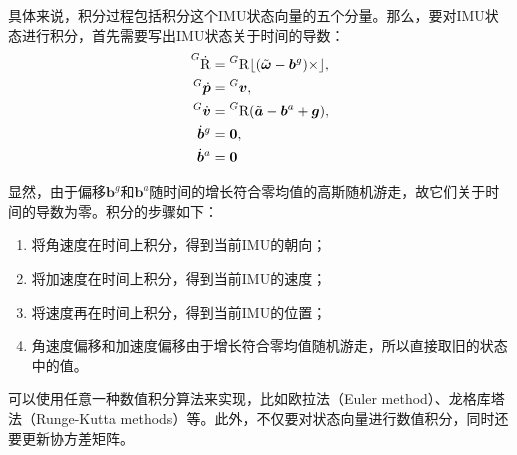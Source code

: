 具体来说，积分过程包括积分这个IMU状态向量的五个分量。那么，要对IMU状态进行积分，首先需要写出IMU状态关于时间的导数：
\begin{equation}
\begin{aligned}
    \prescript{G}{}{\dot{\mathrm R}}
        &= \prescript{G}{}{\mathrm R} \lfloor(\tilde{\bm{\omega}} - \bm{b}^g)\times\rfloor, \\
    \prescript{G}{}{\dot{\bm p}}
        &= \prescript{G}{}{\bm v}, \\
    \prescript{G}{}{\dot{\bm v}}
        &= \prescript{G}{}{\mathrm R} (\tilde{\bm a} - \bm{b}^a + \bm{g}), \\
    \dot{\bm b}^g &= \bm{0}, \\
    \dot{\bm b}^a &= \bm{0}
\end{aligned}
\end{equation}

显然，由于偏移$\bm{b}^g$和$\bm{b}^a$随时间的增长符合零均值的高斯随机游走，故它们关于时间的导数为零。积分的步骤如下：

\begin{enumerate}
    \item 将角速度在时间上积分，得到当前IMU的朝向；
    \item 将加速度在时间上积分，得到当前IMU的速度；
    \item 将速度再在时间上积分，得到当前IMU的位置；
    \item 角速度偏移和加速度偏移由于增长符合零均值随机游走，所以直接取旧的状态中的值。
\end{enumerate}

可以使用任意一种数值积分算法来实现，比如欧拉法（Euler method）、龙格库塔法（Runge-Kutta methods）等。此外，不仅要对状态向量进行数值积分，同时还要更新协方差矩阵。
